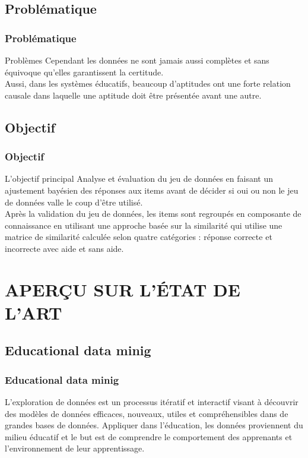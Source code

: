 \documentclass[aspectratio=169,professionalfonts, 12pt]{beamer}
\begin{document}
\subsection{Problématique}
\begin{frame}
  \frametitle{Problématique}
  \justifying
  \begin{alertblock}{Problèmes}
  Cependant les données ne sont jamais aussi complètes et sans équivoque qu’elles garantissent la certitude. \\
  Aussi, dans les systèmes éducatifs, beaucoup d’aptitudes ont une forte relation causale dans laquelle une aptitude doit être présentée avant une autre.
\end{alertblock}
\end{frame}

\subsection{Objectif}

\begin{frame}
  \frametitle{Objectif}
  \begin{block}{L'objectif principal}
    Analyse et évaluation du jeu de données en faisant un ajustement bayésien des réponses aux items avant de décider si oui ou non le jeu de données valle le coup d’être utilisé.\\
    Après la validation du jeu de données, les items sont regroupés en composante de connaissance en utilisant une approche basée sur la similarité qui utilise une matrice de similarité calculée selon quatre catégories : réponse correcte et incorrecte avec aide et sans aide.
  \end{block}     
\end{frame}

\section{APERÇU SUR L'\'ETAT DE L'ART}
\subsection{Educational data minig}

\begin{frame}
  \frametitle{Educational data minig}
  \justifying 
  \begin{minipage}{\textwidth}
  \begin{block}{}
    L’exploration de données est un processus itératif et interactif visant à découvrir des modèles de données efficaces, nouveaux, utiles et compréhensibles dans de grandes bases de données. Appliquer dans l’éducation, les données proviennent du milieu éducatif et le but est de comprendre le comportement des apprenants et l’environnement de leur apprentissage.  
  \end{block}
  \end{minipage}
\end{frame}
\end{document}
